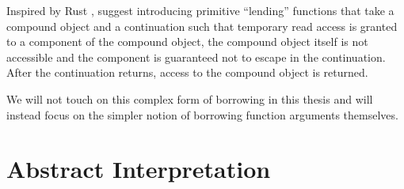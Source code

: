 Inspired by Rust \citep{weiss_oxide_2021}, \citep{spiwack_linearly_2022} suggest introducing primitive ``lending'' functions that take a compound object and a continuation such that temporary read access is granted to a component of the compound object, the compound object itself is not accessible and the component is guaranteed not to escape in the continuation. After the continuation returns, access to the compound object is returned. 

We will not touch on this complex form of borrowing in this thesis and will instead focus on the simpler notion of borrowing function arguments themselves.


\section{Abstract Interpretation}